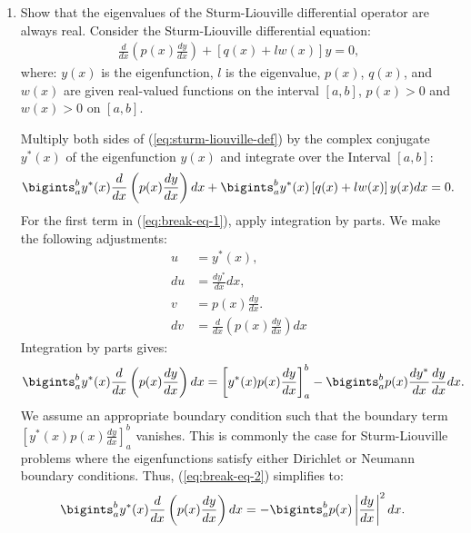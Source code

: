 \begin{enumerate}[label={(\arabic*)}]
    \item Show that the eigenvalues of the Sturm-Liouville differential operator are always real.
    \bigskip\bigskip\hline\hline\bigskip
    Consider the Sturm-Liouville differential equation:
    \begin{align}
        \frac{d}{dx} \left( p(x) \frac{dy}{dx} \right) + \left[ q(x) + l w(x) \right] y = 0, \label{eq:sturm-liouville-def}
    \end{align}
    where: $ y(x) $ is the eigenfunction, $ l $ is the eigenvalue, $ p(x) $, $ q(x) $, and $ w(x) $ are given real-valued functions on the interval $ [a, b] $, $ p(x) > 0 $ and $ w(x) > 0 $ on $ [a, b] $.
    
    Multiply both sides of (\ref{eq:sturm-liouville-def}) by the complex conjugate $ y^*(x) $ of the eigenfunction $ y(x) $ and integrate over the Interval $[a, b]$:
    \begin{align}
        \bigints_a^b y^*(x) \frac{d}{dx} \left( p(x) \frac{dy}{dx} \right) dx + \bigints_a^b y^*(x) \left[ q(x) + l w(x) \right] y(x) dx = 0. \label{eq:break-eq-1}
    \end{align}
    For the first term in (\ref{eq:break-eq-1}), apply integration by parts. We make the following adjustments:
    \begin{align*}
        u &= y^*(x), \\
        du &= \frac{dy^*}{dx} dx, \\
        v &= p(x) \frac{dy}{dx}. \\
        dv &= \frac{d}{dx} \left( p(x) \frac{dy}{dx} \right) dx
    \end{align*}
    Integration by parts gives:
    \begin{align}
        \bigints_a^b y^*(x) \frac{d}{dx} \left( p(x) \frac{dy}{dx} \right) dx &= \left[ y^*(x) p(x) \frac{dy}{dx} \right]_a^b - \bigints_a^b p(x) \frac{dy^*}{dx} \frac{dy}{dx} dx.\label{eq:break-eq-2}
    \end{align}
    We assume an appropriate boundary condition such that the boundary term $\displaystyle\left[ y^*(x) p(x) \frac{dy}{dx} \right]_a^b $ vanishes. This is commonly the case for Sturm-Liouville problems where the eigenfunctions satisfy either Dirichlet or Neumann boundary conditions. Thus, (\ref{eq:break-eq-2}) simplifies to:    
    \begin{align}
        \bigints_a^b y^*(x) \frac{d}{dx} \left( p(x) \frac{dy}{dx} \right) dx &= - \bigints_a^b p(x) \left| \frac{dy}{dx} \right|^2 dx.\label{eq:break-eq-3}

\end{align}
\end{enumerate}
